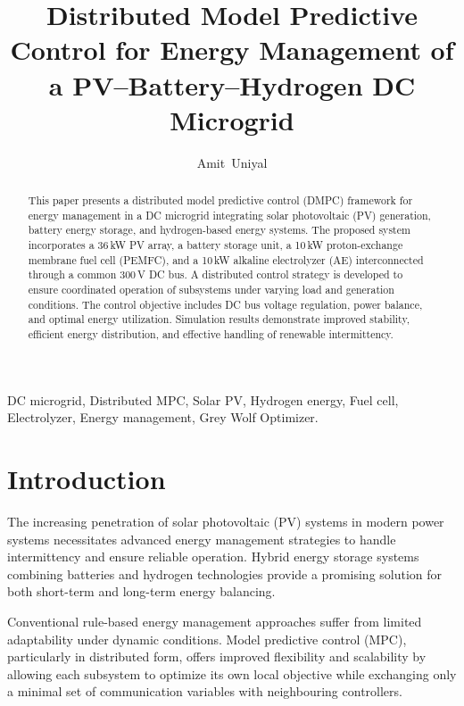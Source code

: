 \documentclass[journal]{IEEEtran}
\begin{document}
\title{Distributed Model Predictive Control for Energy Management of a PV--Battery--Hydrogen DC Microgrid}

\author{Amit~Uniyal}

\maketitle

\begin{abstract}
This paper presents a distributed model predictive control (DMPC) framework
for energy management in a DC microgrid integrating solar photovoltaic (PV)
generation, battery energy storage, and hydrogen-based energy systems. The
proposed system incorporates a 36\,kW PV array, a battery storage unit, a
10\,kW proton-exchange membrane fuel cell (PEMFC), and a 10\,kW alkaline
electrolyzer (AE) interconnected through a common 300\,V DC bus. A
distributed control strategy is developed to ensure coordinated operation of
subsystems under varying load and generation conditions. The control
objective includes DC bus voltage regulation, power balance, and optimal
energy utilization. Simulation results demonstrate improved stability,
efficient energy distribution, and effective handling of renewable
intermittency.
\end{abstract}

\begin{IEEEkeywords}
DC microgrid, Distributed MPC, Solar PV, Hydrogen energy, Fuel cell,
Electrolyzer, Energy management, Grey Wolf Optimizer.
\end{IEEEkeywords}

\section{Introduction}

The increasing penetration of solar photovoltaic (PV) systems in modern
power systems necessitates advanced energy management strategies to handle
intermittency and ensure reliable operation. Hybrid energy storage systems
combining batteries and hydrogen technologies provide a promising solution
for both short-term and long-term energy balancing.

Conventional rule-based energy management approaches suffer from limited
adaptability under dynamic conditions. Model predictive control (MPC),
particularly in distributed form, offers improved flexibility and
scalability by allowing each subsystem to optimize its own local objective
while exchanging only a minimal set of communication variables with
neighbouring controllers.
\end{document}
